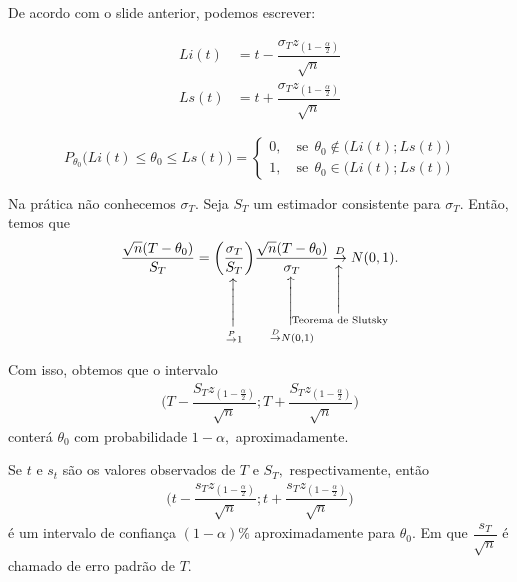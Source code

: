 \documentclass[12pt]{beamer}
\begin{document}
\begin{frame}{}
\begin{block}{}
\justifying
De acordo com o slide anterior, podemos escrever:

\begin{align*}
    Li(t)&=t-\dfrac{\sigma_{T}z_{(1-\frac{\alpha}{2})}}{\sqrt{n}}\\
    Ls(t)&=t+\dfrac{\sigma_{T}z_{(1-\frac{\alpha}{2})}}{\sqrt{n}}
\end{align*}

$$
P_{\theta_{0}}\Big(Li(t)\leq \theta_{0}\leq Ls(t)\Big)=
\begin{cases}
0,\quad \text{se}~~\theta_{0}\notin \Big(Li(t);Ls(t)\Big)\\
1,\quad \text{se}~~\theta_{0} \in \Big(Li(t);Ls(t)\Big)
\end{cases}
$$
\end{block}
\end{frame}

\begin{frame}{}
\begin{block}{}
\justifying
Na prática não conhecemos $\sigma_{T}.$ Seja $S_{T}$ um estimador consistente para $\sigma_{T}.$ Então, temos que
\begin{align*}
    \dfrac{\sqrt{n}(T-\theta_{0})}{S_{T}}=\SetaUP{\ConvP 1}{\left(\dfrac{\sigma_{T}}{S_{T}}\right)}\SetaUP{\ConvD N(0,1)}{\dfrac{\sqrt{n}(T-\theta_{0})}{\sigma_{T}}}\SetaUP{\text{Teorema de Slutsky}}{\ConvD} N(0,1).
\end{align*}
\end{block}
\pause 
\begin{block}{}
\justifying
Com isso, obtemos que o intervalo 
\begin{align*}
    \Big(T-\dfrac{S_{T}z_{(1-\frac{\alpha}{2})}}{\sqrt{n}};T+\dfrac{S_{T}z_{(1-\frac{\alpha}{2})}}{\sqrt{n}}\Big)
\end{align*}
conterá $\theta_{0}$ com probabilidade $1-\alpha,$ aproximadamente.
\end{block}
\end{frame}


\begin{frame}{}
\begin{block}{}
\justifying
Se $t$ e $s_{t}$ são os valores observados de $T$ e $S_{T},$ respectivamente, então
\begin{align*}
    \Big(t-\dfrac{s_{T}z_{(1-\frac{\alpha}{2})}}{\sqrt{n}};t+\dfrac{s_{T}z_{(1-\frac{\alpha}{2})}}{\sqrt{n}}\Big)
\end{align*}
é um intervalo de confiança $(1-\alpha)\%$ aproximadamente para $\theta_{0}.$ Em que $\dfrac{s_{T}}{\sqrt{n}}$ é chamado de erro padrão de $T.$
\end{block}
\end{frame}
\end{document}
